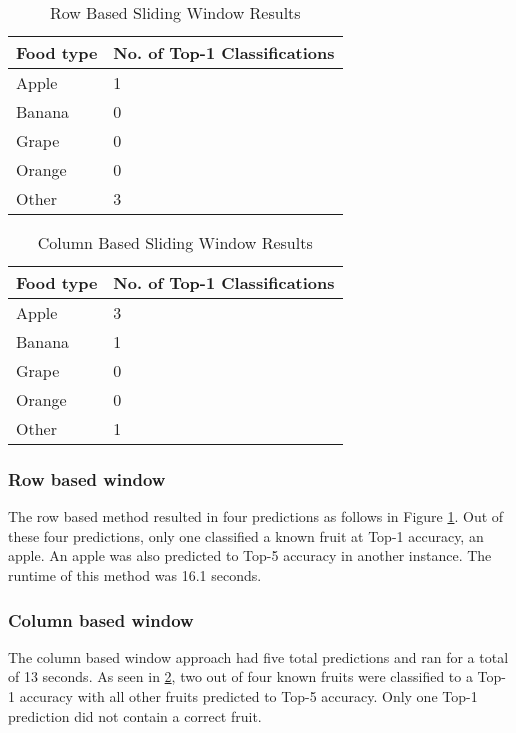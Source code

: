 \begin{table}[]
	\centering
	\caption{Row Based Sliding Window Results}
	\label{rowWindowTable}
	\begin{tabular}{|l|l|}
	\hline
		\textbf{Food type} & \textbf{No. of Top-1 Classifications} \\ \hline
		Apple     & 1                      \\ \hline
		Banana    & 0                      \\ \hline
		Grape     & 0                      \\ \hline
		Orange    & 0                      \\ \hline
		Other     & 3                     \\ \hline
	\end{tabular}
\end{table}

\begin{table}[]
	\centering
	\caption{Column Based Sliding Window Results}
	\label{colWindowTable}
	\begin{tabular}{|l|l|}
	\hline
		\textbf{Food type} & \textbf{No. of Top-1 Classifications} \\ \hline
		Apple     & 3                      \\ \hline
		Banana    & 1                      \\ \hline
		Grape     & 0                      \\ \hline
		Orange    & 0                      \\ \hline
		Other     & 1                     \\ \hline
	\end{tabular}
\end{table}

\subsubsection*{Row based window}
The row based method resulted in four predictions as follows in Figure
\ref{rowWindowTable}. Out of these four predictions, only one classified a known
fruit at Top-1 accuracy, an apple. An apple was also predicted to Top-5 accuracy
in another instance. The runtime of this method was 16.1 seconds.

\subsubsection*{Column based window}
The column based window approach had five total predictions and ran for a total
of 13 seconds. As seen in \ref{colWindowTable}, two out of four known fruits
were classified to a Top-1 accuracy with all other fruits predicted to Top-5
accuracy. Only one Top-1 prediction did not contain a correct fruit.

